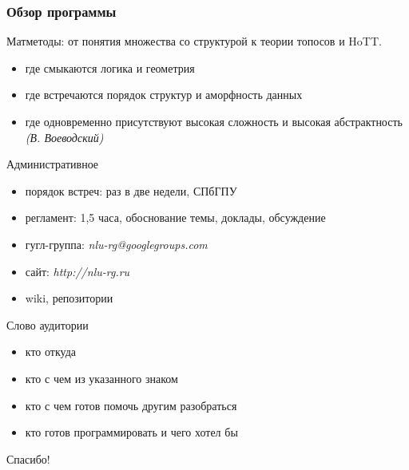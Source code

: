 \documentclass{beamer}
\begin{document}
\begin{frame}[fragile]
\frametitle{Обзор программы}
Матметоды: от понятия множества со структурой к теории топосов и HoTT.\bigskip
\begin{itemize}
  \item где смыкаются логика и геометрия
  \item где встречаются порядок структур и аморфность данных
  \item где одновременно присутствуют высокая сложность и высокая абстрактность \textit{(В. Воеводский)}
\end{itemize}
\end{frame}

\begin{frame}{Административное}
\begin{itemize}
  \item порядок встреч: раз в две недели, СПбГПУ
  \item регламент: 1,5 часа, обоснование темы, доклады, обсуждение
  \item гугл-группа: \textit{nlu-rg@googlegroups.com}
  \item сайт: \textit{http://nlu-rg.ru}
  \item wiki, репозитории
\end{itemize}
\end{frame}

\begin{frame}{Слово аудитории}
\begin{itemize}
  \item кто откуда
  \item кто с чем из указанного знаком 
  \item кто с чем готов помочь другим разобраться
  \item кто готов программировать и чего хотел бы
\end{itemize}
\end{frame}

\begin{frame}{}
\thispagestyle{empty}
\begin{center}
{\large Спасибо!}
\end{center}
\end{frame}


\end{document}
